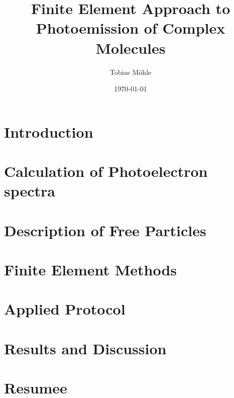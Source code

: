 \documentclass[12pt,a4paper,oneside]{book}
\author{Tobias M\"ohle}
\date{\today }
\title{Finite Element Approach to Photoemission of Complex Molecules}
\begin{document}
\indent
\pagestyle{plain}
\parindent6mm
\setlength{\parskip}{0mm}
\renewcommand{\vec}{\bm}
\newcommand{\mat}[1]{\mathbb{#1}}
\newcommand{\prog}[1]{\texttt{#1}}
\newcommand{\eq}[1]{eq.(\ref{#1})}
\newcommand{\eqs}[1]{eqs.(\ref{#1})}
\frontmatter
\maketitle
\tableofcontents
\newpage

\mainmatter
\chapter{Introduction} %


\chapter{Calculation of Photoelectron spectra}


\chapter{Description of Free Particles} 


\chapter{Finite Element Methods}


\chapter{Applied Protocol}


\chapter{Results and Discussion}


\chapter{Resumee}


\small{
\printbibliography
}
\end{document}
